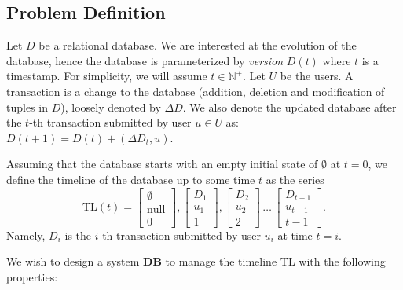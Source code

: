 \subsection{Problem Definition}
\label{sec:problem-def}

\newcommand{\D}{D}
\newcommand{\U}{U}

Let $\D$ be a relational database.  We are interested at the evolution
of the database, hence the database is parameterized by {\em version} $\D(t)$
where $t$ is a timestamp.  For simplicity, we will assume $t\in\mathbb{N}^+$.
Let $\U$ be the users.  A transaction is a change to the database
(addition, deletion and modification of tuples in $\D$), loosely denoted by
$\Delta\D$.  We also denote the updated database after the $t$-th transaction
submitted by user $u\in\U$ as:
$\D(t+1) = \D(t)+(\Delta\D_t, u)$.

Assuming that the database starts with an empty initial state of $\emptyset$ at
$t=0$, we define the timeline of the database up to some time $t$ as the series
$$ \mathrm{TL}(t) = 
    \left[\begin{array}{c} \emptyset \\ \mathrm{null} \\ 0 \end{array}\right],
    \left[\begin{array}{c} \D_1 \\ u_1 \\ 1 \end{array}\right],
    \left[\begin{array}{c} \D_2 \\ u_2 \\ 2 \end{array}\right]
    \,\dots\,
    \left[\begin{array}{c} \D_{t-1} \\ u_{t-1} \\ t-1 \end{array}\right].
    $$
Namely, $\D_i$ is the $i$-th transaction submitted by user $u_i$ at time $t=i$.

We wish to design a system $\mathbf{DB}$ to manage the timeline $\mathrm{TL}$ with
the following properties:

